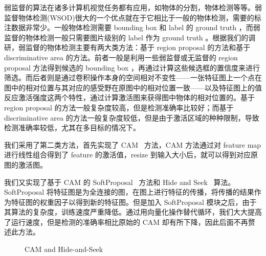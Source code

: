 \documentclass[a4paper]{ctexart}
\begin{document}
弱监督的算法在诸多计算机视觉任务都有应用，如物体的分割，物体检测等等。弱监督物体检测(WSOD)很大的一个优点就在于它相比于一般的物体检测，需要的标注数据非常少。一般物体检测需要 bounding box 和 label 的 ground truth ，而弱监督的物体检测一般只需要图片级别的 label 作为 ground truth 。根据我们的调研，弱监督的物体检测主要有两大类方法：基于 region proposal 的方法和基于 discriminative area 的方法。前者一般是利用一些弱监督或无监督的 region proposal 方法得到候选的 bounding box ，再通过计算这些候选框的置信度来进行筛选。而后者则是通过卷积操作本身的空间相对不变性——一张特征图上一个点在图中的相对位置与其对应的感受野在原图中的相对位置一致——以及特征图上的值反应激活强度这两个特性，通过计算激活图来获得图中物体的相对位置的。基于 region proposal 的方法一般复杂度较高，但是检测准确率比较好；而基于 discriminative area 的方法一般复杂度较低，但是由于激活区域的种种限制，导致检测准确率较低，尤其在多目标的情况下。

我们采用了第二类方法，首先实现了 CAM~\cite{zhou2016learning} 方法，CAM 方法通过对 feature map 进行线性组合得到了 feature 的激活值，resize 到输入大小后，就可以得到对应原图的激活图。

我们又实现了基于 CAM 的 SoftProposal~\cite{zhu2017soft} 方法和 Hide and Seek~\cite{singh2017hide} 算法。SoftProposal 将特征图是为全连接的图，在图上进行特征的传播，将传播的结果作为特征图的权重因子以得到新的特征图。但是加入 SoftProposal 模块之后，由于其算法的复杂度，训练速度严重降低。通过用向量化操作替代循环，我们大大提高了运行速度，但是检测的准确率相比原始的 CAM 却有所下降，因此后面不再赘述此方法。

\begin{figure}[t]
   \centering
   \hfil
   \caption{CAM and Hide-and-Seek}
   \label{fig:CAM}
\end{figure}
\end{document}
